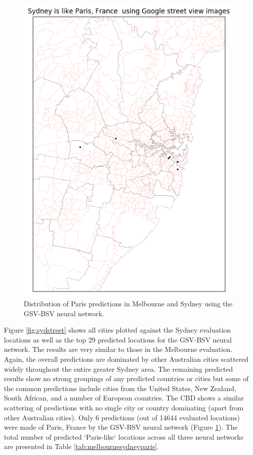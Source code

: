\documentclass[sageh,times]{sagej}
\begin{document}
\begin{figure}[!htbp]
\includegraphics[scale=0.40]{Images/Sydney_Paris,France-GSV.png} 
\caption{Distribution of Paris predictions in Melbourne and Sydney using the GSV-BSV neural network.}    
 \label{fig:gsv_melsyd_paris}  
\end{figure}


Figure \ref{fig:sydstreet} shows all cities plotted against the Sydney evaluation locations as well as the top 29 predicted locations for the GSV-BSV neural network. The results are very similar to those in the Melbourne evaluation. Again, the overall predictions are dominated by other Australian cities scattered widely throughout the entire greater Sydney area. The remaining predicted results show no strong groupings of any predicted countries or cities but some of the common predictions include cities from the United States, New Zealand, South African, and a number of European countries. The CBD shows a similar scattering of predictions with no single city or country dominating (apart from other Australian cities). Only 6 predictions (out of 14644 evaluated locations) were made of Paris, France by the GSV-BSV neural network (Figure \ref{fig:gsv_melsyd_paris}). The total number of predicted `Paris-like` locations across all three neural networks are presented in Table \ref{tab:melbournesydneyparis}.
\end{document}
